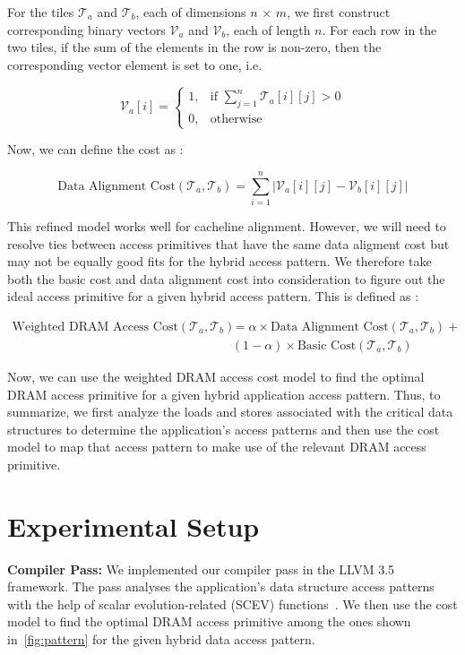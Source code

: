 \documentclass[letterpaper]{article}
\begin{document}
For the tiles $\mathcal{T}_{a}$ and $\mathcal{T}_{b}$, each of dimensions $n$
$\times$ $m$, we first construct corresponding binary vectors $\mathcal{V}_{a}$
and $\mathcal{V}_{b}$, each of length $n$. For each row in the two tiles, 
if the sum of the elements in the row is non-zero, then the corresponding vector
element is set to one, i.e.

\[
\mathcal{V}_{a}[i] =
\begin{cases}
1 , & \text{if } \sum_{j=1}^{n} \mathcal{T}_{a}[i][j] > 0 \\
0 , & \text{otherwise} 
\end{cases}
\]

Now, we can define the cost as :

$$\text{Data Alignment Cost}(\mathcal{T}_{a}, \mathcal{T}_{b}) = \sum_{i=1}^{n} 
| \mathcal{V}_{a}[i][j] - \mathcal{V}_{b}[i][j] |$$

This refined model works well for cacheline alignment. However, we will need to
resolve ties between access primitives that have the same data aligment cost but
may not be equally good fits for the hybrid access pattern.
We therefore take both the basic cost and data alignment cost into consideration
to figure out the ideal access primitive for a given hybrid access pattern.
This is defined as :

\begin{align*}
\text{Weighted DRAM Access Cost}(\mathcal{T}_{a}, \mathcal{T}_{b}) 
&= \alpha \times \text{Data Alignment Cost}(\mathcal{T}_{a}, \mathcal{T}_{b})
+ \\
& (1-\alpha) \times \text{Basic Cost}(\mathcal{T}_{a}, \mathcal{T}_{b})
\end{align*}

Now, we can use the weighted DRAM access cost model to find the optimal DRAM
access primitive for a given hybrid application access pattern. Thus, to summarize,
we first analyze the loads and stores associated with the critical data
structures to determine the application's access patterns and then use the
cost model to map that access pattern to make use of the relevant DRAM access
primitive.

\section{Experimental Setup}

\textbf{Compiler Pass:} We implemented our compiler pass in the LLVM
3.5 framework. The pass analyses the application's data structure access
patterns with the help of scalar evolution-related (SCEV)
functions~\cite{llvm15}. 
We then use the cost model to find the optimal DRAM access primitive 
among the ones shown in~\cref{fig:pattern} for the given hybrid data access
pattern.
\end{document}
